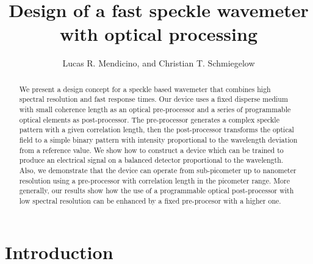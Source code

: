 \documentclass{optica-article}
\begin{document}
\title{Design of a fast speckle wavemeter with optical processing}

\author{Lucas R. Mendicino, and Christian T. Schmiegelow}

\address{ Universidad de Buenos Aires, Facultad de Ciencias Exactas y Naturales, Departamento de Física. Buenos Aires, Argentina.
\\
 CONICET - Universidad de Buenos Aires, Instituto de Física de Buenos Aires (IFIBA). Buenos Aires, Argentina}







\begin{abstract}
    We present a design concept for a speckle based wavemeter that combines high spectral resolution and fast response times. Our device uses a fixed disperse medium with small coherence length as an optical pre-processor and a series of programmable optical elements as post-processor.
    The pre-processor generates a complex speckle pattern with a given correlation length, then the post-processor transforms the optical field to a simple binary pattern with intensity proportional to the wavelength deviation from a reference value. We show how to construct a device which can be trained to produce an electrical signal on a balanced detector proportional to the wavelength.
    Also, we demonstrate that the device can operate from sub-picometer up to nanometer resolution using a pre-processor with correlation length in the picometer range. 
    More generally, our results show how the use of a programmable optical post-processor with low spectral resolution can be enhanced by a fixed pre-procesor with a higher one.
\end{abstract}

\section{Introduction}
\end{document}
